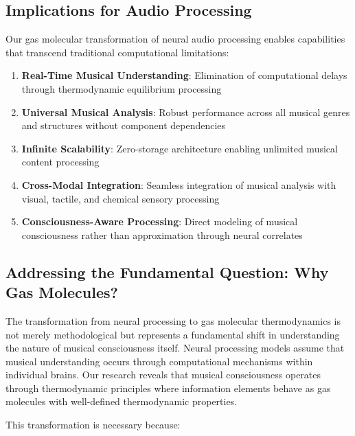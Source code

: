 \subsection{Implications for Audio Processing}

Our gas molecular transformation of neural audio processing enables capabilities that transcend traditional computational limitations:

\begin{enumerate}
\item \textbf{Real-Time Musical Understanding}: Elimination of computational delays through thermodynamic equilibrium processing
\item \textbf{Universal Musical Analysis}: Robust performance across all musical genres and structures without component dependencies
\item \textbf{Infinite Scalability}: Zero-storage architecture enabling unlimited musical content processing
\item \textbf{Cross-Modal Integration}: Seamless integration of musical analysis with visual, tactile, and chemical sensory processing
\item \textbf{Consciousness-Aware Processing}: Direct modeling of musical consciousness rather than approximation through neural correlates
\end{enumerate}

\subsection{Addressing the Fundamental Question: Why Gas Molecules?}

The transformation from neural processing to gas molecular thermodynamics is not merely methodological but represents a fundamental shift in understanding the nature of musical consciousness itself. Neural processing models assume that musical understanding occurs through computational mechanisms within individual brains. Our research reveals that musical consciousness operates through thermodynamic principles where information elements behave as gas molecules with well-defined thermodynamic properties.

This transformation is necessary because:

